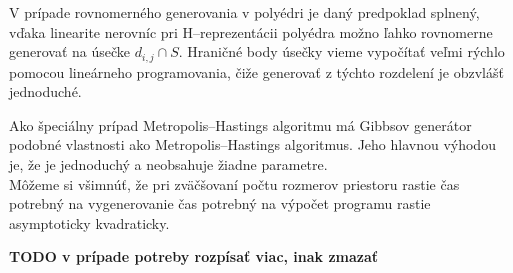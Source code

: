 V prípade rovnomerného generovania v polyédri je daný predpoklad splnený, vďaka linearite nerovníc pri H--reprezentácii polyédra možno ľahko rovnomerne generovať na úsečke $d_{i,j} \cap S$. Hraničné body úsečky vieme vypočítať veľmi rýchlo pomocou lineárneho programovania, čiže generovať z týchto rozdelení je obzvlášť jednoduché.

Ako špeciálny prípad Metropolis--Hastings algoritmu má Gibbsov generátor podobné vlastnosti ako Metropolis--Hastings algoritmus. Jeho hlavnou výhodou je, že je jednoduchý a neobsahuje žiadne parametre.\\

Môžeme si všimnúť, že pri zväčšovaní počtu rozmerov priestoru rastie čas potrebný na vygenerovanie čas potrebný na výpočet programu rastie asymptoticky kvadraticky.

\textbf{TODO v prípade potreby rozpísať viac, inak zmazať}